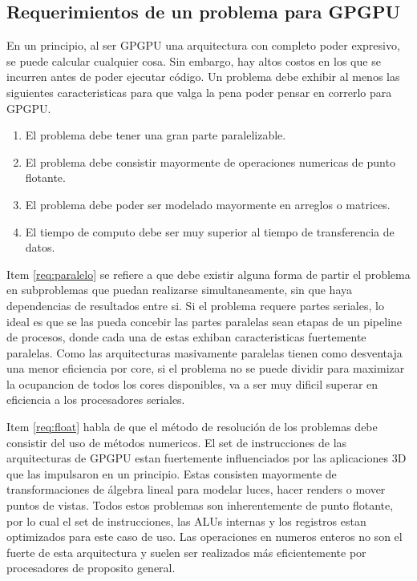 \subsection{Requerimientos de un problema para GPGPU}
En un principio, al ser GPGPU una arquitectura con completo poder expresivo, se puede
calcular cualquier cosa. Sin embargo, hay altos costos en los que se incurren antes de
poder ejecutar c\'odigo. Un problema debe exhibir al menos las siguientes caracteristicas
para que valga la pena poder pensar en correrlo para GPGPU.
\begin{enumerate}
  \item \label{req:paralelo} El problema debe tener una gran parte paralelizable.
  \item \label{req:float} El problema debe consistir mayormente de operaciones numericas de punto flotante.
  \item \label{req:matrix} El problema debe poder ser modelado mayormente en arreglos o matrices.
  \item \label{req:transf} El tiempo de computo debe ser muy superior al tiempo de transferencia de datos.
\end{enumerate}

Item \ref{req:paralelo} se refiere a que debe existir alguna forma de partir el problema
en subproblemas que puedan realizarse simultaneamente, sin que haya dependencias de
resultados entre si. Si el problema requere partes seriales, lo ideal es que se las
pueda concebir las partes paralelas sean etapas de un pipeline de procesos, donde
cada una de estas exhiban caracteristicas fuertemente paralelas. Como las arquitecturas
masivamente paralelas tienen como desventaja una menor eficiencia por core, si el
problema no se puede dividir para maximizar la ocupancion de todos los cores disponibles,
va a ser muy dificil superar en eficiencia a los procesadores seriales.

Item \ref{req:float} habla de que el m\'etodo de resoluci\'on de los problemas debe
consistir del uso de m\'etodos numericos. El set de instrucciones de las arquitecturas
de GPGPU estan fuertemente influenciados por las aplicaciones 3D que las impulsaron
en un principio. Estas consisten mayormente de transformaciones de \'algebra lineal
para modelar luces, hacer renders o mover puntos de vistas. Todos estos problemas
son inherentemente de punto flotante, por lo cual el set de instrucciones, las ALUs
internas y los registros estan optimizados para este caso de uso. Las operaciones
en numeros enteros no son el fuerte de esta arquitectura y suelen ser realizados
m\'as eficientemente por procesadores de proposito general.

